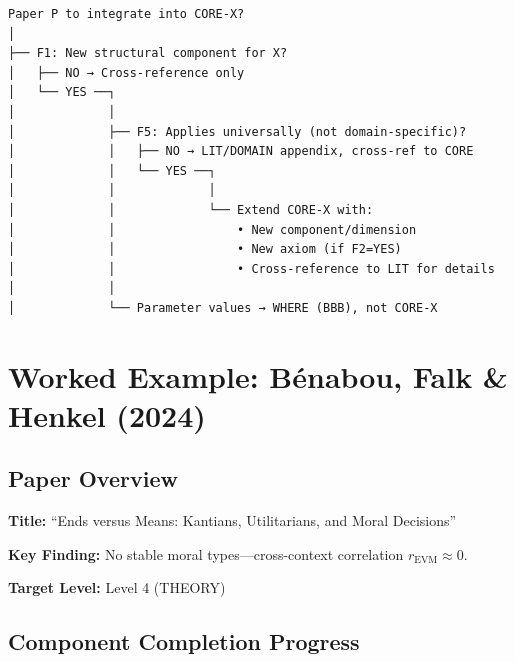 \begin{verbatim}
Paper P to integrate into CORE-X?
│
├── F1: New structural component for X?
│   ├── NO → Cross-reference only
│   └── YES ──┐
│             │
│             ├── F5: Applies universally (not domain-specific)?
│             │   ├── NO → LIT/DOMAIN appendix, cross-ref to CORE
│             │   └── YES ──┐
│             │             │
│             │             └── Extend CORE-X with:
│             │                 • New component/dimension
│             │                 • New axiom (if F2=YES)
│             │                 • Cross-reference to LIT for details
│             │
│             └── Parameter values → WHERE (BBB), not CORE-X
\end{verbatim}


\section{Worked Example: Bénabou, Falk \& Henkel (2024)}
\label{sec:paperint-example}

\subsection{Paper Overview}

\textbf{Title:} ``Ends versus Means: Kantians, Utilitarians, and Moral Decisions''

\textbf{Key Finding:} No stable moral types---cross-context correlation $r_{\text{EVM}} \approx 0$.

\textbf{Target Level:} Level 4 (THEORY)

\subsection{Component Completion Progress}

